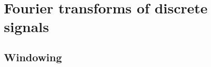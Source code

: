 \documentclass[main.tex]{subfiles}
\begin{document}
\appendix
\section{Fourier transforms of discrete signals}

\subsection{Windowing} 
\end{document}
